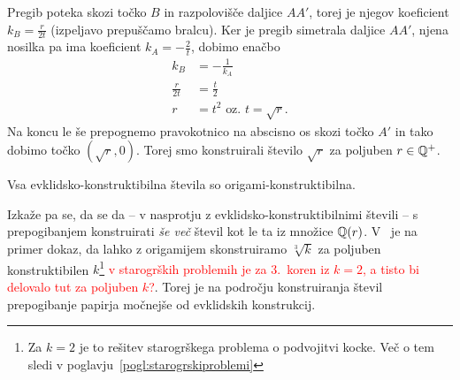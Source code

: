 \begin{dokaz}
    Pregib poteka skozi točko $B$ in razpolovišče daljice $AA'$, torej je njegov koeficient $k_B = \frac{r}{2t}$ (izpeljavo prepuščamo bralcu). Ker je pregib simetrala daljice $AA'$, njena nosilka pa ima koeficient $k_A = - \frac{2}{t}$, dobimo enačbo
    \begin{align*}
        k_B &= - \frac{1}{k_A}\\
        \frac{r}{2t} &= \frac{t}{2}\\
        r &= t^2 \text{ oz. } t = \sqrt{r}.
    \end{align*}
    Na koncu le še prepognemo pravokotnico na abscisno os skozi točko $A'$ in tako dobimo točko $(\sqrt{r}, 0)$. Torej smo konstruirali število $\sqrt{r}$ za poljuben $r \in \mathbb Q^{+}$.
\end{dokaz}

\begin{posledica}
    Vsa evklidsko-konstruktibilna števila so origami-konstruktibilna.
\end{posledica}

Izkaže pa se, da se da -- v nasprotju z evklidsko-konstruktibilnimi števili -- s prepogibanjem konstruirati \emph{še več} števil kot le ta iz množice $\mathbb Q(r)$. V~\cite[str.\ 156]{geometricconstructions} je na primer dokaz, da lahko z origamijem skonstruiramo $\sqrt[3]{k} $ za poljuben konstruktibilen $k$\footnote{Za $k = 2$ je to rešitev starogrškega problema o podvojitvi kocke. Več o tem sledi v poglavju~\ref{pogl:starogrskiproblemi}} \textcolor{red}{v starogrških problemih je za 3.\ koren iz $k = 2$, a tisto bi delovalo tut za poljuben $k$?}. Torej je na področju konstruiranja števil prepogibanje papirja močnejše od evklidskih konstrukcij.